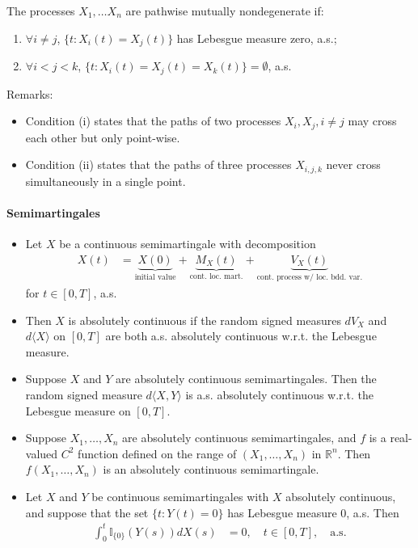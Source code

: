 \documentclass[a4paper,landscape,8pt,fleqn]{scrartcl}
\begin{document}
\begin{multicols*}{3}
The processes $X_1, \ldots X_n$ are pathwise mutually nondegenerate if:
\begin{enumerate}
\item $\forall i \neq j$, $\lbrace t: X_i(t) = X_j(t) \rbrace$ has Lebesgue measure zero, a.s.;
\item $\forall i<j<k$, $\lbrace t: X_i(t) = X_j(t) = X_k(t) \rbrace = \emptyset$, a.s.
\end{enumerate}

Remarks:
\begin{itemize}
\item Condition (i) states that the paths of two processes $X_i, X_j, i \neq j$ may cross each other but only point-wise.
\item Condition (ii) states that the paths of three processes $X_{i,j,k}$ never cross simultaneously in a single point.
\end{itemize}

\paragraph{Semimartingales}

\begin{itemize}
\item Let $X$ be a continuous semimartingale with decomposition
\begin{align*}
X(t) &= \underbrace{X(0)}\limits_\text{initial value} + \underbrace{M_X(t)}\limits_\text{cont. loc. mart.} + \underbrace{V_X(t)}\limits_\text{cont. process w/ loc. bdd. var.}
\end{align*}
for $t \in [0,T]$, a.s.
\item Then $X$ is absolutely continuous if the random signed measures $dV_X$ and $d\langle X \rangle$ on $[0,T]$ are both a.s. absolutely continuous w.r.t. the Lebesgue measure.
\item Suppose $X$ and $Y$ are absolutely continuous semimartingales. Then the random signed measure $d\langle X,Y \rangle$ is a.s. absolutely continuous w.r.t. the Lebesgue measure on $[0,T]$.
\item Suppose $X_1, \ldots, X_n$ are absolutely continuous semimartingales, and $f$ is a real-valued $C^2$ function defined on the range of $(X_1, \ldots, X_n)$ in $\mathbb{R}^n$. Then $f(X_1, \ldots, X_n)$ is an absolutely continuous semimartingale.
\item Let $X$ and $Y$ be continuous semimartingales with $X$ absolutely continuous, and suppose that the set $\lbrace t: Y(t) = 0 \rbrace$ has Lebesgue measure 0, a.s. Then
\begin{align*}
\int_0^t \mathbb{I}_{\lbrace 0 \rbrace} (Y(s)) dX(s) &= 0, \quad t \in [0,T], \quad \text{a.s.}
\end{align*}
\end{itemize}


\end{multicols*}
\end{document}
